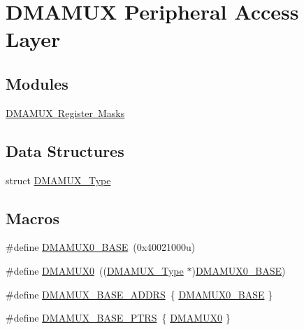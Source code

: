 \hypertarget{group___d_m_a_m_u_x___peripheral___access___layer}{}\section{D\+M\+A\+M\+UX Peripheral Access Layer}
\label{group___d_m_a_m_u_x___peripheral___access___layer}
\subsection*{Modules}
\begin{DoxyCompactItemize}
\item 
\mbox{\hyperlink{group___d_m_a_m_u_x___register___masks}{D\+M\+A\+M\+U\+X Register Masks}}
\end{DoxyCompactItemize}
\subsection*{Data Structures}
\begin{DoxyCompactItemize}
\item 
struct \mbox{\hyperlink{struct_d_m_a_m_u_x___type}{D\+M\+A\+M\+U\+X\+\_\+\+Type}}
\end{DoxyCompactItemize}
\subsection*{Macros}
\begin{DoxyCompactItemize}
\item 
\#define \mbox{\hyperlink{group___d_m_a_m_u_x___peripheral___access___layer_ga53dad94854927e3f0d04159ddae91b12}{D\+M\+A\+M\+U\+X0\+\_\+\+B\+A\+SE}}~(0x40021000u)
\item 
\#define \mbox{\hyperlink{group___d_m_a_m_u_x___peripheral___access___layer_gab65f26d32cad2fbb14838d5c831203ec}{D\+M\+A\+M\+U\+X0}}~((\mbox{\hyperlink{struct_d_m_a_m_u_x___type}{D\+M\+A\+M\+U\+X\+\_\+\+Type}} $\ast$)\mbox{\hyperlink{group___d_m_a_m_u_x___peripheral___access___layer_ga53dad94854927e3f0d04159ddae91b12}{D\+M\+A\+M\+U\+X0\+\_\+\+B\+A\+SE}})
\item 
\#define \mbox{\hyperlink{group___d_m_a_m_u_x___peripheral___access___layer_ga829aeb2ec17eff9c9fa684315a70bc2a}{D\+M\+A\+M\+U\+X\+\_\+\+B\+A\+S\+E\+\_\+\+A\+D\+D\+RS}}~\{ \mbox{\hyperlink{group___d_m_a_m_u_x___peripheral___access___layer_ga53dad94854927e3f0d04159ddae91b12}{D\+M\+A\+M\+U\+X0\+\_\+\+B\+A\+SE}} \}
\item 
\#define \mbox{\hyperlink{group___d_m_a_m_u_x___peripheral___access___layer_gaad218c12978071501dc2899f0624de4b}{D\+M\+A\+M\+U\+X\+\_\+\+B\+A\+S\+E\+\_\+\+P\+T\+RS}}~\{ \mbox{\hyperlink{group___d_m_a_m_u_x___peripheral___access___layer_gab65f26d32cad2fbb14838d5c831203ec}{D\+M\+A\+M\+U\+X0}} \}
\end{DoxyCompactItemize}


